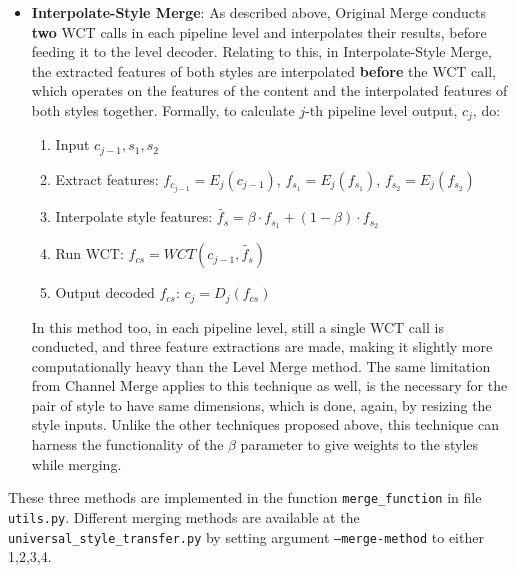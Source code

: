 \begin{itemize}
	\item \textbf{Interpolate-Style Merge}: As described above, Original Merge conducts \textbf{two} WCT calls in each pipeline level and interpolates their results, before feeding it to the level decoder. Relating to this, in Interpolate-Style Merge, the extracted features of both styles are interpolated \textbf{before} the WCT call, which operates on the features of the content and the interpolated features of both styles together. Formally, to calculate $j$-th pipeline level output, $c_j$, do:
	\begin{enumerate}
		\item Input $c_{j-1}, s_1, s_2$
		\item Extract features: $f_{c_{j-1}} = E_j(c_{j-1})$, $f_{s_1} = E_j(f_{s_1})$, $f_{s_2} = E_j(f_{s_2})$
		\item Interpolate style features: $\tilde{f_{s}} = \beta\cdot f_{s_1} + (1-\beta)\cdot f_{s_2}$
		\item Run WCT: $f_{cs} = WCT(c_{j-1}, \tilde{f_{s}})$
		\item Output decoded $f_{cs}$: $c_j = D_j(f_{cs})$
	\end{enumerate}
	In this method too, in each pipeline level, still a single WCT call is conducted, and three feature extractions are made, making it slightly more computationally heavy than the Level Merge method. The same limitation from Channel Merge applies to this technique as well, is the necessary for the pair of style to have same dimensions, which is done, again, by resizing the style inputs. Unlike the other techniques proposed above, this technique can harness the functionality of the $\beta$ parameter to give weights to the styles while merging.
\end{itemize}
These three methods are implemented in the function \texttt{merge\_function} in file \texttt{utils.py}. Different merging methods are available at the \texttt{universal\_style\_transfer.py} by setting argument \texttt{--merge-method} to either 1,2,3,4. 
